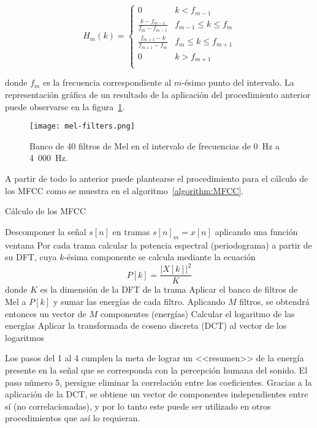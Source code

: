 \begin{equation}
    \label{eq:Mel filterbank}
    H_m(k) = \begin{cases}
                 0 & k < f_{m-1} \\
                 \frac{k-f_{m-1}}{f_m - f_{m-1}} & f_{m-1}\leq k\leq f_m \\
                 \frac{f_{m+1}-k}{f_{m+1}-f_m} & f_m \leq k\leq f_{m+1} \\
                 0 & k > f_{m+1} \\
    \end{cases}
\end{equation}

\noindent
donde $f_m$ es la frecuencia correspondiente al $m$-ésimo punto del intervalo.
La representación gráfica de un resultado de la aplicación del procedimiento anterior puede observarse en la figura~\ref{img:mel-filters}.

\begin{figure}[!h]
    \centering
    \texttt{[image: mel-filters.png]}
    \caption{Banco de 40 filtros de Mel en el intervalo de frecuencias de 0~Hz a 4~000~Hz.}
    \label{img:mel-filters}
\end{figure}

A partir de todo lo anterior puede plantearse el procedimiento para el cálculo de los MFCC como se muestra en el algoritmo~\ref{algorithm:MFCC}.

\begin{algorithm}
    \caption{Cálculo de los MFCC}
    \label{algorithm:MFCC}
    Descomponer la señal $s[n]$ en tramas $s[n]_m = x[n]$ aplicando una función ventana\;
    Por cada trama calcular la potencia espectral (periodograma) a partir de su DFT, cuya $k$-ésima componente se calcula mediante la ecuación
    \begin{equation*}
        P[k] = \frac{|X[k]|^2}{K}
    \end{equation*}
    donde $K$ es la dimensión de la DFT de la trama\;
    Aplicar el banco de filtros de Mel a $P[k]$ y sumar las energías de cada filtro.
    Aplicando $M$ filtros, se obtendrá entonces un vector de $M$ componentes (energías)\;
    Calcular el logaritmo de las energías\;
    Aplicar la transformada de coseno discreta (DCT) al vector de los logaritmos\;
\end{algorithm}

Los pasos del 1 al 4 cumplen la meta de lograr un <<resumen>> de la energía presente en la señal que se corresponda con la percepción humana del sonido.
El paso número 5, persigue eliminar la correlación entre los coeficientes.
Gracias a la aplicación de la DCT, se obtiene un vector de componentes independientes entre sí (no correlacionadas), y por lo tanto este puede ser utilizado en otros procedimientos que así lo requieran.

